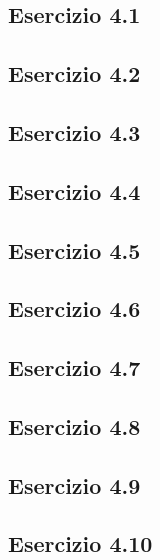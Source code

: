 \subsection{\textbf{Esercizio 4.1}}

\subsection{\textbf{Esercizio 4.2}}

\subsection{\textbf{Esercizio 4.3}}

\subsection{\textbf{Esercizio 4.4}}

\subsection{\textbf{Esercizio 4.5}}

\subsection{\textbf{Esercizio 4.6}}

\subsection{\textbf{Esercizio 4.7}}

\subsection{\textbf{Esercizio 4.8}}

\subsection{\textbf{Esercizio 4.9}}

\subsection{\textbf{Esercizio 4.10}}

